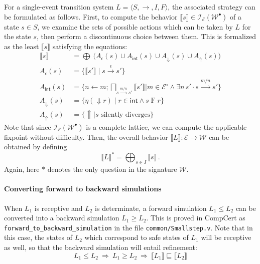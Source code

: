 \documentclass[sigplan,10pt,review,anonymous]{acmart}
\newcommand{\kw}[1]{\ensuremath{ \mathsf{#1} }}
\newcommand{\bdot}{\cdot}
\newcommand{\que}{{\circ}}
\newcommand{\ans}{{\bullet}}
\begin{document}
For a single-event transition system
$L = \langle S, {\rightarrow}, I, F \rangle$,
the associated strategy
can be formulated as follows.
First,
to compute the behavior
$\llbracket s \rrbracket \in \mathcal{I}_\mathcal{E}(\mathcal{W}^\ans)$
of a state $s \in S$,
we examine the sets of possible actions
which can be taken by $L$
for the state $s$,
then perform a discontinuous choice between them.
This is formalized as the least $\llbracket s \rrbracket$
satisfying the equations:
\begin{align*}
  \llbracket s \rrbracket &=
    \bigoplus \:
    \big(
      A_\epsilon(s) \cup A_\kw{int}(s) \cup
      A_\Downarrow(s) \cup A_\Uparrow(s)
    \big)
  \\
  A_\epsilon(s) &=
    \{ \llbracket s' \rrbracket \mid s \stackrel{\epsilon}{\rightarrow} s' \}
  \\
  A_\kw{int}(s) &=
    \Big\{
      n \mathbin\leftarrow m \mathbin;
      \bigsqcap_{s \stackrel{m/n}{\longrightarrow} s'}
	\llbracket s' \rrbracket
    \mathrel{\Big\vert}
      m \in \mathcal{E}^\que \wedge
      \exists n \, s' \bdot s \stackrel{m/n}{\longrightarrow} s'
    \Big\}
  \\
  A_\Downarrow(s) &=
    \{ \eta({\Downarrow} r) \mid r \in \kw{int} \wedge s \mathrel{F} r \}
  \\
  A_\Uparrow(s) &=
    \{ {\Uparrow} \mid s \text{ silently diverges} \}
\end{align*}
Note that since $\mathcal{I}_\mathcal{E}(\mathcal{W}^\ans)$
is a complete lattice,
we can compute the applicable fixpoint without difficulty.
Then,
the overall behavior
$\llbracket L \rrbracket : \mathcal{E} \rightarrow \mathcal{W}$
can be obtained by defining
\[
  \llbracket L \rrbracket^* = \bigoplus_{s \in I} \llbracket s \rrbracket
  \,.
\]
Again, here $*$ denotes the only question in the signature $\mathcal{W}$.

\paragraph{Converting forward to backward simulations}

When $L_1$ is receptive and $L_2$ is determinate,
a forward simulation $L_1 \le L_2$ can be converted
into a backward simulation $L_1 \ge L_2$.
This is proved in CompCert
as \texttt{forward\_to\_backward\_simulation}
in the file \texttt{common/Smallstep.v}.
Note that in this case,
the states of $L_2$ which correspond
to safe states of $L_1$ will be receptive as well,
so that the backward simulation will entail refinement:
\[
  L_1 \le L_2 \: \Rightarrow \:
  L_1 \ge L_2 \: \Rightarrow \:
  \llbracket L_1 \rrbracket \sqsubseteq \llbracket L_2 \rrbracket
\]
\end{document}
